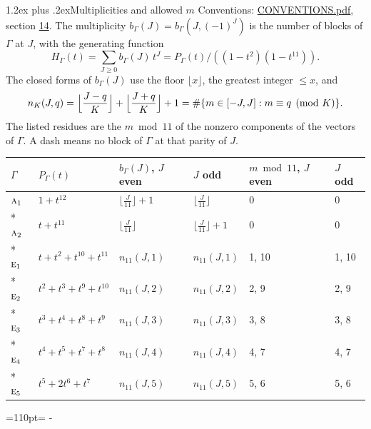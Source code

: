 \documentclass[10pt,a4paper]{article}
\makeatletter
\renewcommand\section{\@startsection{section}{1}{\z@}{-3ex plus -1ex minus -.2ex}%
  {1.2ex plus .2ex}{\normalfont\large\sffamily\bfseries\color{parttitle}}}
\newcommand{\needspace}[1]{\par\penalty-100\begingroup\dimen0=#1\relax\dimen2=\pagegoal
  \advance\dimen2-\pagetotal\ifdim\dimen0>\dimen2\relax\ifdim\dimen2>0pt\vfil\break\fi\fi
  \endgroup}
\numberwithin{equation}{section}
\newcommand{\irr}[1]{\text{\normalfont\scshape #1}}
\makeatother
\begin{document}
\section{Multiplicities and allowed \texorpdfstring{$m$}{m}}\label{s:multiplicities}
Conventions: \href{../../CONVENTIONS.pdf}{CONVENTIONS.pdf}, section \href{../../CONVENTIONS.pdf\#conv.14}{14}.
\leavevmode\label{n:function.generating}\label{n:index.generating.variable}\label{n:function.generating.numerator}The multiplicity $b_\Gamma(J) = b_\Gamma(J, (-1)^J)$ is the number of blocks of $\Gamma$ at $J$, with the generating function
\begin{equation}\label{e:gf}H_\Gamma(t) = \sum_{J\ge0} b_\Gamma(J)\,t^J = P_\Gamma(t)/((1-t^{2})(1-t^{11})).\end{equation}
\leavevmode\label{n:delimiter.floor}\label{n:local.floor.x}\label{n:function.count}\label{n:index.modulus.K}\label{n:index.residue}The closed forms of $b_\Gamma(J)$ use the floor $\lfloor x\rfloor$, the greatest integer $\le x$, and
\begin{equation}\label{e:count}n_K(J,q) = \Bigl\lfloor\frac{J-q}{K}\Bigr\rfloor + \Bigl\lfloor\frac{J+q}{K}\Bigr\rfloor + 1 = \#\{m\in[-J,J] : m\equiv q \pmod{K}\}.\end{equation}
\leavevmode\label{n:head.parity}The listed residues are the $m \bmod 11$ of the nonzero components of the vectors of $\Gamma$. A dash means no block of $\Gamma$ at that parity of $J$.
{\small{\renewcommand{\arraystretch}{1.3}\begin{longtable}{@{}llllll@{}}\toprule
$\Gamma$ & $P_\Gamma(t)$ & $b_\Gamma(J)$, $J$ even & $J$ odd & $m \bmod 11$, $J$ even & $J$ odd\\\midrule\endhead
\bottomrule\endfoot\endlastfoot
$\irr{a}_{1}$ & $1 + t^{12}$ & $\bigl\lfloor\tfrac{J}{11}\bigr\rfloor + 1$ & $\bigl\lfloor\tfrac{J}{11}\bigr\rfloor$ & 0 & 0\\*
$\irr{a}_{2}$ & $t + t^{11}$ & $\bigl\lfloor\tfrac{J}{11}\bigr\rfloor$ & $\bigl\lfloor\tfrac{J}{11}\bigr\rfloor + 1$ & 0 & 0\\*
$\irr{e}_{1}$ & $t + t^{2} + t^{10} + t^{11}$ & $n_{11}(J,1)$ & $n_{11}(J,1)$ & 1, 10 & 1, 10\\*
$\irr{e}_{2}$ & $t^{2} + t^{3} + t^{9} + t^{10}$ & $n_{11}(J,2)$ & $n_{11}(J,2)$ & 2, 9 & 2, 9\\*
$\irr{e}_{3}$ & $t^{3} + t^{4} + t^{8} + t^{9}$ & $n_{11}(J,3)$ & $n_{11}(J,3)$ & 3, 8 & 3, 8\\*
$\irr{e}_{4}$ & $t^{4} + t^{5} + t^{7} + t^{8}$ & $n_{11}(J,4)$ & $n_{11}(J,4)$ & 4, 7 & 4, 7\\*
$\irr{e}_{5}$ & $t^{5} + 2t^{6} + t^{7}$ & $n_{11}(J,5)$ & $n_{11}(J,5)$ & 5, 6 & 5, 6\\
\bottomrule\end{longtable}}}
\needspace{110pt}
\end{document}
